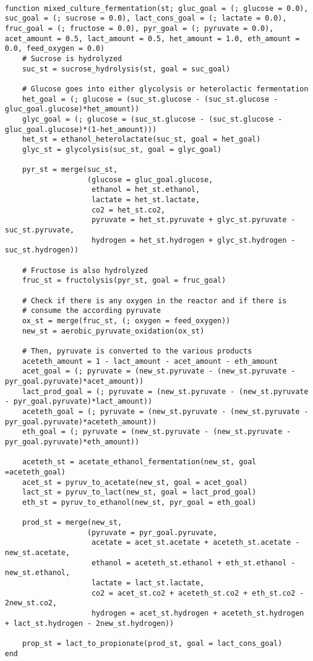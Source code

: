 \documentclass[11pt]{article}
\begin{document}
\begin{verbatim}

function mixed_culture_fermentation(st; gluc_goal = (; glucose = 0.0), suc_goal = (; sucrose = 0.0), lact_cons_goal = (; lactate = 0.0), fruc_goal = (; fructose = 0.0), pyr_goal = (; pyruvate = 0.0), acet_amount = 0.5, lact_amount = 0.5, het_amount = 1.0, eth_amount = 0.0, feed_oxygen = 0.0)
    # Sucrose is hydrolyzed
    suc_st = sucrose_hydrolysis(st, goal = suc_goal)

    # Glucose goes into either glycolysis or heterolactic fermentation
    het_goal = (; glucose = (suc_st.glucose - (suc_st.glucose - gluc_goal.glucose)*het_amount))
    glyc_goal = (; glucose = (suc_st.glucose - (suc_st.glucose - gluc_goal.glucose)*(1-het_amount)))
    het_st = ethanol_heterolactate(suc_st, goal = het_goal)
    glyc_st = glycolysis(suc_st, goal = glyc_goal)

    pyr_st = merge(suc_st,
                   (glucose = gluc_goal.glucose,
                    ethanol = het_st.ethanol,
                    lactate = het_st.lactate,
                    co2 = het_st.co2,
                    pyruvate = het_st.pyruvate + glyc_st.pyruvate - suc_st.pyruvate,
                    hydrogen = het_st.hydrogen + glyc_st.hydrogen - suc_st.hydrogen))

    # Fructose is also hydrolyzed
    fruc_st = fructolysis(pyr_st, goal = fruc_goal)

    # Check if there is any oxygen in the reactor and if there is
    # consume the according pyruvate
    ox_st = merge(fruc_st, (; oxygen = feed_oxygen))
    new_st = aerobic_pyruvate_oxidation(ox_st)

    # Then, pyruvate is converted to the various products
    aceteth_amount = 1 - lact_amount - acet_amount - eth_amount
    acet_goal = (; pyruvate = (new_st.pyruvate - (new_st.pyruvate - pyr_goal.pyruvate)*acet_amount))
    lact_prod_goal = (; pyruvate = (new_st.pyruvate - (new_st.pyruvate - pyr_goal.pyruvate)*lact_amount))
    aceteth_goal = (; pyruvate = (new_st.pyruvate - (new_st.pyruvate - pyr_goal.pyruvate)*aceteth_amount))
    eth_goal = (; pyruvate = (new_st.pyruvate - (new_st.pyruvate - pyr_goal.pyruvate)*eth_amount))

    aceteth_st = acetate_ethanol_fermentation(new_st, goal =aceteth_goal)
    acet_st = pyruv_to_acetate(new_st, goal = acet_goal)
    lact_st = pyruv_to_lact(new_st, goal = lact_prod_goal)
    eth_st = pyruv_to_ethanol(new_st, pyr_goal = eth_goal)

    prod_st = merge(new_st,
                   (pyruvate = pyr_goal.pyruvate,
                    acetate = acet_st.acetate + aceteth_st.acetate - new_st.acetate,
                    ethanol = aceteth_st.ethanol + eth_st.ethanol - new_st.ethanol,
                    lactate = lact_st.lactate,
                    co2 = acet_st.co2 + aceteth_st.co2 + eth_st.co2 - 2new_st.co2,
                    hydrogen = acet_st.hydrogen + aceteth_st.hydrogen + lact_st.hydrogen - 2new_st.hydrogen))

    prop_st = lact_to_propionate(prod_st, goal = lact_cons_goal)
end

\end{verbatim}
\end{document}
